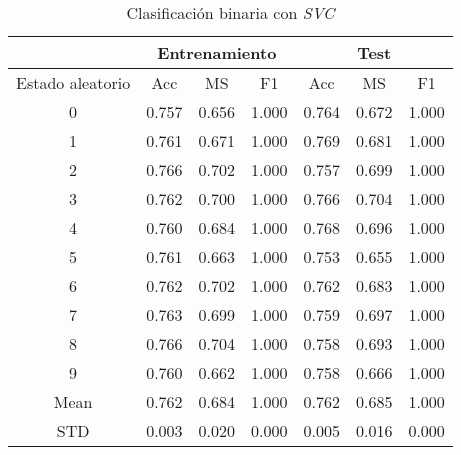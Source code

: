 \begin{table}[th]
	\centering
	\begin{tabular}{ |c|c|c|c|c|c|c| }
		\hline
		\rowcolor{LightCyan}
		 & \multicolumn{3}{c|}{Entrenamiento} & \multicolumn{3}{c|}{Test} \\
		\hline
		\rowcolor{LightCyan}
		 Estado aleatorio & Acc & MS & F1 & Acc & MS & F1 \\
		\hline
		0 & 0.757 & 0.656 & 1.000 & 0.764 & 0.672 & 1.000 \\
		1 & 0.761 & 0.671 & 1.000 & 0.769 & 0.681 & 1.000 \\
		2 & 0.766 & 0.702 & 1.000 & 0.757 & 0.699 & 1.000 \\
		3 & 0.762 & 0.700 & 1.000 & 0.766 & 0.704 & 1.000 \\
		4 & 0.760 & 0.684 & 1.000 & 0.768 & 0.696 & 1.000 \\
		5 & 0.761 & 0.663 & 1.000 & 0.753 & 0.655 & 1.000 \\
		6 & 0.762 & 0.702 & 1.000 & 0.762 & 0.683 & 1.000 \\
		7 & 0.763 & 0.699 & 1.000 & 0.759 & 0.697 & 1.000 \\
		8 & 0.766 & 0.704 & 1.000 & 0.758 & 0.693 & 1.000 \\
		9 & 0.760 & 0.662 & 1.000 & 0.758 & 0.666 & 1.000 \\
		Mean & 0.762 & 0.684 & 1.000 & 0.762 & 0.685 & 1.000 \\
		STD & 0.003 & 0.020 & 0.000 & 0.005 & 0.016 & 0.000 \\
		\hline
	\end{tabular}
	\caption{Clasificación binaria con \textit{SVC}}
	\label{tabla:svm_bin}
\end{table}
